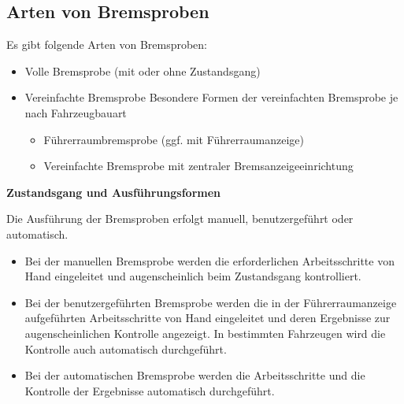 \subsection{Arten von Bremsproben}
Es gibt folgende Arten von Bremsproben:
\begin{itemize}
    \item Volle Bremsprobe (mit oder ohne Zustandsgang)
    \item Vereinfachte Bremsprobe\newline
    Besondere Formen der vereinfachten Bremsprobe je nach Fahrzeugbauart
    \begin{itemize}
        \item Führerraumbremsprobe (ggf. mit Führerraumanzeige)
        \item Vereinfachte Bremsprobe mit zentraler Bremsanzeigeeinrichtung
    \end{itemize}
\end{itemize}
\textbf{Zustandsgang und Ausführungsformen}\par
Die Ausführung der Bremsproben erfolgt manuell, benutzergeführt oder automatisch.
\begin{itemize}
    \item Bei der manuellen Bremsprobe werden die erforderlichen Arbeitsschritte von Hand eingeleitet und augenscheinlich beim Zustandsgang kontrolliert. 
    \item Bei der benutzergeführten Bremsprobe werden die in der Führerraumanzeige aufgeführten Arbeitsschritte von Hand eingeleitet und deren Ergebnisse zur augenscheinlichen Kontrolle angezeigt. In bestimmten Fahrzeugen wird die Kontrolle auch automatisch durchgeführt.
    \item Bei der automatischen Bremsprobe werden die Arbeitsschritte und die Kontrolle der Ergebnisse automatisch durchgeführt.
\end{itemize}
